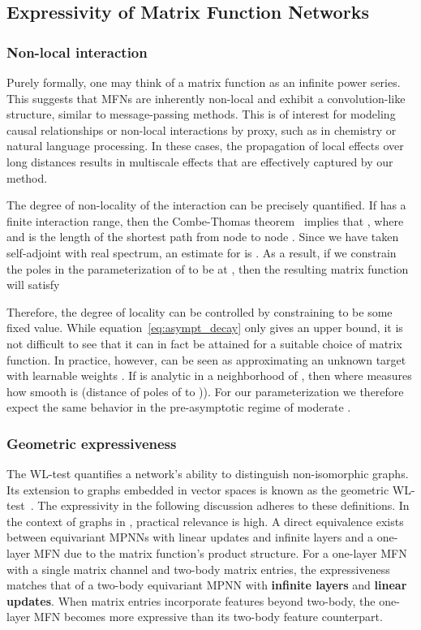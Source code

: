 \documentclass{article} \usepackage{iclr2024_conference,times}
\def\eqref#1{equation~\ref{#1}}
\begin{document}
\subsection{Expressivity of Matrix Function Networks}


\subsubsection*{Non-local interaction}
\vspace{-5pt}
Purely formally, one may think of a matrix function  as an infinite power series.
This suggests that MFNs are inherently non-local and exhibit a convolution-like structure, similar to message-passing methods. 
This is of interest for modeling causal relationships or non-local interactions by proxy, such as in chemistry or natural language processing. In these cases, the propagation of local effects over long distances results in multiscale effects that are effectively captured by our method.

The degree of non-locality of the interaction can be precisely quantified. If  has a finite interaction range, then the Combe-Thomas theorem~\cite{Combes1973} implies that
, where  and  is the length of the shortest path from node  to node . Since we have taken  self-adjoint with real spectrum, an estimate for  is . As a result, if we constrain the poles in the parameterization of  to be at , then the resulting matrix function will satisfy 

Therefore, the degree of locality can be controlled by constraining  to be some fixed value. 
While \eqref{eq:asympt_decay} only gives an upper bound, it is not difficult to see that it can in fact be attained for a suitable choice of matrix function. 
In practice, however,  can be seen as approximating an unknown target  with learnable weights . If  is analytic in a neighborhood of , then  where  measures how smooth  is (distance of poles of  to )). For our parameterization  we therefore expect the same behavior  in the pre-asymptotic regime of moderate . 

\vspace{-6pt}
\subsubsection*{Geometric expressiveness}
\vspace{-5pt}
The WL-test quantifies a network's ability to distinguish non-isomorphic graphs. Its extension to graphs embedded in vector spaces is known as the geometric WL-test~\citep{joshi2023expressive}. The expressivity in the following discussion adheres to these definitions.
In the context of graphs in , practical relevance is high. A direct equivalence exists between equivariant MPNNs with linear updates and infinite layers and a one-layer MFN due to the matrix function's product structure.
For a one-layer MFN with a single matrix channel and two-body matrix entries, the expressiveness matches that of a two-body equivariant MPNN with \textbf{infinite layers} and \textbf{linear updates}. When matrix entries incorporate features beyond two-body, the one-layer MFN becomes more expressive than its two-body feature counterpart.
\end{document}
